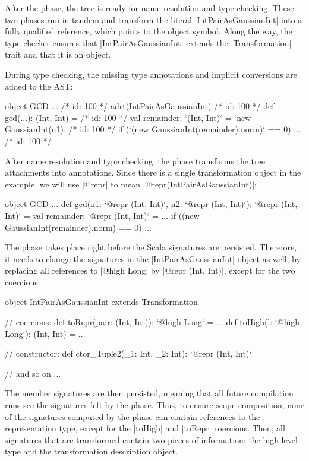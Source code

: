 After the \postparser{} phase, the tree is ready for name resolution and type checking. These two phases run in tandem and transform the literal |IntPairAsGaussianInt| into a fully qualified reference, which points to the object symbol. Along the way, the type-checker ensures that |IntPairAsGaussianInt| extends the |Transformation| trait and that it is an object.

During type checking, the missing type annotations and implicit conversions are added to the AST:


\begin{lstlisting-nobreak}
object GCD {
  ...
  /* id: 100 */ adrt(IntPairAsGaussianInt) {}
  /* id: 100 */ def gcd(...): (Int, Int) = {
  /* id: 100 */       val remainder: `(Int, Int)` = `new GaussianInt(n1).%
  /* id: 100 */       if (`(new GaussianInt(remainder).norm)` == 0) ...
  /* id: 100 */ }
}
\end{lstlisting-nobreak}

After name resolution and type checking, the \inject{} phase transforms the tree attachments into annotations. Since there is a single transformation object in the example, we will use |@repr| to mean |@repr(IntPairAsGaussianInt)|:


\begin{lstlisting-nobreak}
object GCD {
  ...
  def gcd(n1: `@repr (Int, Int)`, n2: `@repr (Int, Int)`): `@repr (Int, Int)` = {
    val remainder: `@repr (Int, Int)` = ...
    if ((new GaussianInt(remainder).norm) == 0) ...
  }
}
\end{lstlisting-nobreak}

The \inject{} phase takes place right before the Scala signatures are persisted. Therefore, it needs to change the signatures in the |IntPairAsGaussianInt| object as well, by replacing all references to |@high Long| by |@repr (Int, Int)|, except for the two coercions:


\begin{lstlisting-nobreak}
object IntPairAsGaussianInt extends Transformation{
  // coercions:
  def toRepr(pair: (Int, Int)): `@high Long` = ...
  def toHigh(l: `@high Long`): (Int, Int) = ...

  // constructor:
  def ctor_Tuple2(_1: Int, _2: Int): `@repr (Int, Int)`

  // and so on ...
}
\end{lstlisting-nobreak}

The member signatures are then persisted, meaning that all future compilation runs see the signatures left by the \inject{} phase. Thus, to ensure scope composition, none of the signatures computed by the \inject{} phase can contain references to the representation type, except for the |toHigh| and |toRepr| coercions. Then, all signatures that are transformed contain two pieces of information: the high-level type and the transformation description object.


